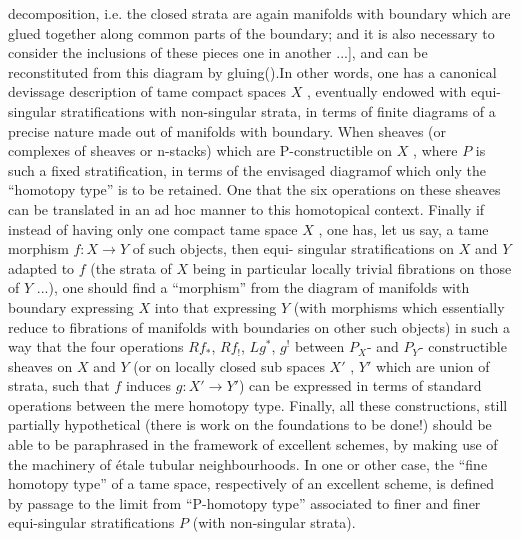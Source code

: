 
decomposition, i.e. the closed strata are again manifolds with boundary which
are glued together along common parts of the boundary; and it is also
necessary to consider the inclusions of these pieces one in another ...],
and can be reconstituted from this diagram by gluing().In other words, one
has a canonical devissage description of tame compact spaces $X$ , eventually
endowed with equi-singular stratifications with non-singular strata, in terms
of finite diagrams of a precise nature made out of manifolds with boundary.
When  sheaves (or complexes of sheaves\hand{,} or n-stacks) which
are P-constructible on $X$ , where $P$ is such a fixed stratification, 
 in terms of the envisaged diagram\hand{,}of which only the ``homotopy
type'' is to be retained. One  that the six operations on these sheaves
can be translated in an ad hoc manner to this homotopical context. Finally\hand{,}
if instead of having only one compact tame space $X$ , one has, let us say,
a tame morphism $f : X \to Y$ of such objects, then  equi-%
singular stratifications on $X$ and $Y$ adapted to $f$ (the strata of $X$
being in particular locally trivial fibrations on those of $Y$ ...), one
should find a ``morphism'' from the diagram of manifolds with boundary
expressing $X$ into that expressing $Y$ (with  morphisms which
essentially reduce to fibrations of  manifolds with boundaries on other such
objects) in such a way that the four operations $Rf_*$, $Rf_!$, $Lg^*$, $g^!$ between
$P_X$- and $P_Y$- constructible sheaves on $X$ and $Y$ (or on locally closed
sub spaces $X'$ , $Y'$ which are union of strata, such that $f$ induces
$g : X' \to Y'$) can be expressed in terms of standard operations between the
mere homotopy type. Finally, all these constructions, still partially
hypothetical (there is work on the foundations to be done!) should be able
to be paraphrased in the framework of excellent schemes, by making use of
the machinery of étale tubular neighbourhoods. In one or other case, the
``fine homotopy type'' of a tame space, respectively of an excellent scheme,
is defined by passage to the limit from ``P-homotopy type'' associated to finer
and finer equi-singular stratifications $P$ (with non-singular strata).

